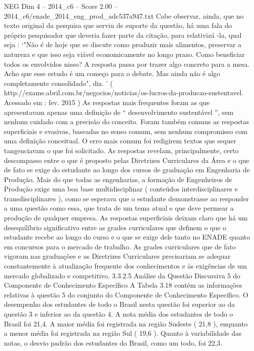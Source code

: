 \begin{textsample}{NEG Dim 4 – 2014\_c6 – Score 2.00 – 2014\_c6/enade\_2014\_eng\_prod\_adc537a947.txt}
Cabe observar, ainda, que no texto original da pesquisa que serviu de suporte da questão, há uma fala do próprio pesquisador que deveria fazer parte da citação, para relativizá -la, qual seja : ‘"Não é de hoje que se discute como produzir mais alimentos, preservar a natureza e que isso seja viável economicamente no longo prazo.
Como beneficiar todos os envolvidos nisso?
A resposta passa por trazer algo concreto para a mesa.
Acho que esse estudo é um começo para o debate.
Mas ainda não é algo completamente consolidado", diz. ’ ( http://exame.abril.com.br/negocios/noticias/os-lucros-da-producao-sustentavel.
Acessado em : fev. 2015 ) As respostas mais frequentes foram as que apresentavam apenas uma definição de “ desenvolvimento sustentável ”, sem nenhum cuidado com a precisão do conceito.
Foram também comuns as respostas superficiais e evasivas, baseadas no senso comum, sem nenhum compromisso com uma definição conceitual.
O erro mais comum foi redigirem textos que sequer tangenciavam o que foi solicitado.
As respostas revelam, principalmente, certo descompasso entre o que é proposto pelas Diretrizes Curriculares da Área e o que de fato se exige do estudante ao longo dos cursos de graduação em Engenharia de Produção.
Mais do que todas as engenharias, a formação de Engenheiros de Produção exige uma boa base multidisciplinar ( conteúdos interdisciplinares e transdisciplinares ), como se esperava que o estudante demonstrasse ao responder a uma questão como essa, que trata de um tema atual e que deve permear a produção de qualquer empresa.
As respostas superficiais deixam claro que há um desequilíbrio significativo entre as grades curriculares que definem o que o estudante recebe ao longo do curso e o que se exige dele tanto no ENADE quanto em concursos para o mercado de trabalho.
As grades curriculares que de fato vigoram nas graduações e as Diretrizes Curriculares precisariam se adequar constantemente à atualização frequente dos conhecimentos e às exigências de um mercado globalizado e competitivo. 3.3.2.5 Análise da Questão Discursiva 5 do Componente de Conhecimento Específico A Tabela 3.18 contém as informações relativas à questão 5 do conjunto do Componente de Conhecimento Específico.
O desempenho dos estudantes de todo o Brasil nesta questão foi superior ao da questão 3 e inferior ao da questão 4.
A nota média dos estudantes de todo o Brasil foi 21,4.
A maior média foi registrada na região Sudeste ( 21,8 ), enquanto a menor média foi registrada na região Sul ( 19,6 ).
Quanto à variabilidade das notas, o desvio padrão dos estudantes do Brasil, como um todo, foi 22,3.

\end{textsample}
